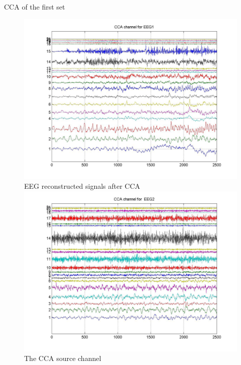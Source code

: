 \documentclass[t,12pt,english
\ifx\beamermode\undefined\else,\beamermode\fi
]{beamer}
\begin{document}
\begin{frame}{CCA of the first set}

\begin{figure}[!htbp]
%
\centering
\includegraphics[width=1\textwidth]{3.jpg}\\
\tiny{\tiny EEG reconstructed signals after CCA}
\endminipage\hfill
{}%
\centering
\includegraphics[width=1\textwidth]{4.jpg}\\
\tiny{\tiny The CCA source channel}
\endminipage\hfill
{}%
\centering

\end{figure}
\end{frame}
\end{document}
